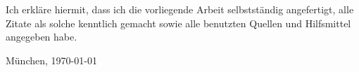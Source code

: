 \documentclass[11pt,a4paper,twoside]{article}
\begin{document}
    \noindent Ich erkl\"are hiermit, dass ich die vorliegende Arbeit
    selbstst\"andig angefertigt, alle Zitate als solche kenntlich gemacht
    sowie alle benutzten Quellen und Hilfsmittel angegeben habe.

    \bigskip\noindent M\"unchen, \today

    \vspace{4ex}\noindent\makebox[7cm]{\dotfill}


\cleardoublepage

    \pagestyle{fancy}
    \setcounter{page}{1}

\tableofcontents


\cleardoublepage

\setcounter{page}{1}
\fancyhead[LE,RO]{\rightmark}
\fancyhead[LO,RE]{\leftmark}
\fancyfoot[LE,RO]{\thepage}




    
    


\cleardoublepage %

    

    


\cleardoublepage

    

    \clearpage
    


\cleardoublepage

    



\cleardoublepage
\end{document}
